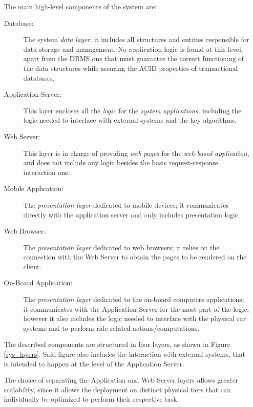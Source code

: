 The main high-level components of the system are:

\begin{description}
\item[Database:] The system \textit{data layer}; it includes all structures and entities responsible for data storage and management. No application logic is found at this level, apart from the DBMS one that must guarantee the correct functioning of the data structures while assuring the ACID properties of transactional databases.
\item[Application Server:] This layer encloses all the \textit{logic} for the \textit{system applications}, including the logic needed to interface with external systems and the key algorithms.
\item[Web Server:] This layer is in charge of providing \textit{web pages} for the \textit{web-based application}, and does not include any logic besides the basic request-response interaction one.
\item[Mobile Application:] The \textit{presentation layer} dedicated to mobile devices; it communicates directly with the application server and only includes presentation logic.
\item[Web Browser:] The \textit{presentation layer} dedicated to web browsers; it relies on the connection with the Web Server to obtain the pages to be rendered on the client.
\item[On-Board Application:] The \textit{presentation layer} dedicated to the on-board computers applications; it communicates with the Application Server for the most part of the logic; however it also includes the logic needed to interface with the physical car systems and to perform ride-related actions/computations.
\end{description}

The described components are structured in four layers, as shown in Figure \ref{sys_layers}. Said figure also includes the interaction with external systems, that is intended to happen at the level of the Application Server.

The choice of separating the Application and Web Server layers allows greater scalability, since it allows the deployment on distinct physical tiers that can individually be optimized to perform their respective task.

